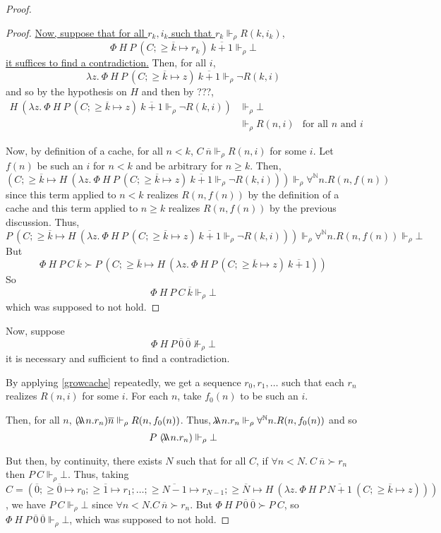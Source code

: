 \documentclass{article}
\newcommand{\N}{\mathbb{N}}
\newcommand{\depforall}[1]{\forall^\N #1.}
\newcommand{\realizes}{\Vdash}
\newcommand{\oracle}[2]{\lambda\mkern-15mu\lambda\ #1. #2}
\begin{document}
\begin{proof}
\begin{proof}
    \ul{Now, suppose that for all $r_k, i_k$ such that $r_k \realizes_\rho R(k, i_k)$},
    \[ \Phi\ H\ P\ (C; \ge \overline{k} \mapsto r_k)\ \overline{k+1} \realizes_\rho \bot \]
    \ul{it suffices to find a contradiction.} Then, for all $i$,
    \[ \lambda z.\ \Phi\ H\ P\ (C; \ge \overline{k} \mapsto z)\ \overline{k+1} \realizes_\rho \neg R(k, i) \]
    and so by the hypothesis on $H$ and then by ???,
    \begin{align*}
        H\ (\lambda z.\ \Phi\ H\ P\ (C; \ge \overline{k} \mapsto z)\ \overline{k+1} \realizes_\rho \neg R(k, i)) & \realizes_\rho \bot \\
        & \realizes_\rho R(n, i) & \text{for all $n$ and $i$}
    \end{align*}

    Now, by definition of a cache, for all $n < k$, $C\ \overline{n} \realizes_\rho R(n, i)$ for some $i$.
    Let $f(n)$ be such an $i$ for $n < k$ and be arbitrary for $n \ge k$.
    Then,
    \[(C; \ge \overline{k} \mapsto H\ (\lambda z.\ \Phi\ H\ P\ (C; \ge \overline{k} \mapsto z)\ \overline{k+1} \realizes_\rho \neg R(k, i))) \realizes_\rho \depforall{n} R(n, f(n))\]
    since this term applied to $n < k$ realizes $R(n, f(n))$ by the definition of a cache and this term applied to $n \ge k$ realizes $R(n, f(n))$ by the previous discussion.
    Thus,
    \[P\ (C; \ge \overline{k} \mapsto H\ (\lambda z.\ \Phi\ H\ P\ (C; \ge \overline{k} \mapsto z)\ \overline{k+1} \realizes_\rho \neg R(k, i))) \realizes_\rho \depforall{n} R(n, f(n)) \realizes_\rho \bot\]
    But
    \[\Phi\ H\ P\ C\ \overline{k} \succ P\ (C; \ge \overline{k} \mapsto H\ (\lambda z.\ \Phi\ H\ P\ (C; \ge \overline{k} \mapsto z)\ \overline{k+1}))\]
    So
    \[\Phi\ H\ P\ C\ \overline{k} \realizes_\rho \bot\]
    which was supposed to not hold.
\end{proof}

Now, suppose
\[ \Phi\ H\ P\ \overline{0}\ \overline{0} \not\realizes_\rho \bot \]
it is necessary and sufficient to find a contradiction.

By applying \cref{growcache} repeatedly, we get a sequence $r_0, r_1, \dots$ such that each $r_n$ realizes $R(n, i)$ for some $i$.
For each $n$, take $f_0(n)$ to be such an $i$.

Then, for all $n$, $(\oracle{n}{r_n}) \overline{n} \realizes_\rho R(n, f_0(n))$.
Thus, $\oracle{n}{r_n} \realizes_\rho \depforall{n} R(n, f_0(n))$ and so \[P\ (\oracle{n}{r_n}) \realizes_\rho \bot\]

But then, by continuity, there exists $N$ such that for all $C$, if $\forall n < N.\ C\ \overline{n} \succ r_n$ then $P\ C \realizes_\rho \bot$. Thus, taking $C = (\overline{0}; \ge \overline{0} \mapsto r_0; \ge \overline{1} \mapsto r_1; \dots; \ge \overline{N-1} \mapsto r_{N-1}; \ge \overline{N} \mapsto H\ (\lambda z.\ \Phi\ H\ P\ \overline{N+1}\ (C; \ge \overline{k} \mapsto z)))$, we have $P\ C \realizes_\rho \bot$ since $\forall n < N. C\ \overline{n} \succ r_n$.
But $\Phi\ H\ P\ \overline{0}\ \overline{0} \succ P\ C$, so $\Phi\ H\ P\ \overline{0}\ \overline{0} \realizes_\rho \bot$, which was supposed to not hold.

\end{proof}
\end{document}
